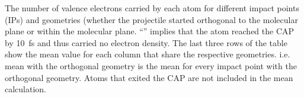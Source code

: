 \begin{table}[t]
    \caption{The number of valence electrons carried by each atom for different impact points (IPs) and geometries (whether the projectile started orthogonal to the molecular plane or within the molecular plane. ``\textemdash'' implies that the atom reached the CAP by 10~fs and thus carried no electron density. The last three rows of the table show the mean value for each column that share the respective geometries. i.e. mean with the orthogonal geometry is the mean for every impact point with the orthogonal geometry. Atoms that exited the CAP are not included in the mean calculation.}
    \label{tab:number-electrons}
\end{table}
    